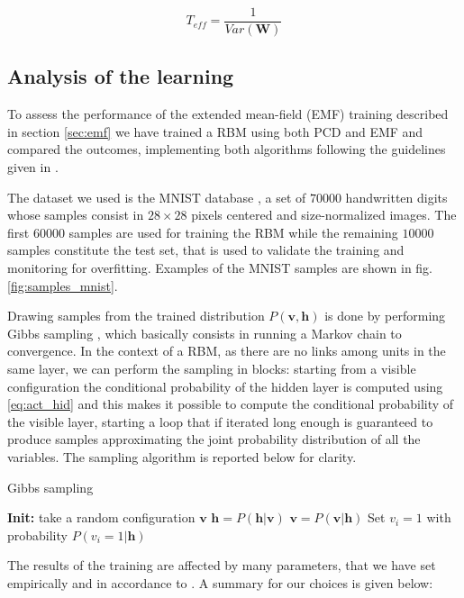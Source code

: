 \documentclass[notitlepage]{revtex4-1}
\begin{document}
\begin{equation}
T_{eff} = \frac{1}{Var(\mathbf{W})}
\label{eq:t_eff}
\end{equation}

\subsection{Analysis of the learning}
To assess the performance of the extended mean-field (EMF) training described in section \ref{sec:emf} we have trained a RBM using both PCD and EMF and compared the outcomes, implementing both algorithms following the guidelines given in \cite{Hinton_guide}.

The dataset we used is the MNIST database \cite{mnist}, a set of \(70000\) handwritten digits whose samples consist in \(28 \times 28\) pixels centered and size-normalized images. The first \(60000\) samples are used for training the RBM while the remaining \(10000\) samples constitute the test set, that is used to validate the training and monitoring for overfitting. Examples of the MNIST samples are shown in fig. \ref{fig:samples_mnist}.

Drawing samples from the trained distribution \(P(\mathbf{v},\mathbf{h})\) is done by performing Gibbs sampling \cite{gibbs}, which basically consists in running a Markov chain to convergence. In the context of a RBM, as there are no links among units in the same layer, we can perform the sampling in blocks: starting from a visible configuration the conditional probability of the hidden layer is computed using \eqref{eq:act_hid} and this makes it possible to compute the conditional probability of the visible layer, starting a loop that if iterated long enough is guaranteed to produce samples approximating the joint probability distribution of all the variables. The sampling algorithm is reported below for clarity.

\begin{algorithm}[H]
\caption{Gibbs sampling}\label{alg:gibbs}
\begin{algorithmic}[1]
\State \textbf{Init:} take a random configuration \(\mathbf{v}\)
  \State \( \mathbf{h} = P(\mathbf{h}|\mathbf{v}) \)
  \State \( \mathbf{v} = P(\mathbf{v}|\mathbf{h}) \)
\EndFor
\State Set \(v_i = 1\) with probability \(P(v_i = 1|\mathbf{h})\)
\end{algorithmic}
\end{algorithm}

The results of the training are affected by many parameters, that we have set empirically and in accordance to \cite{PCD}\cite{tap_train}. A summary for our choices is given below:
\end{document}
